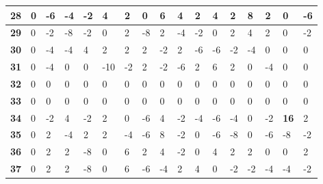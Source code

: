 \begin{longtable}[c]{|l|l|l|l|l|l|l|l|l|l|l|l|l|l|l|l|l|}
\textbf{28} & 0          & -6         & -4         & -2         & 4          & 2          & 0          & 6          & 4          & 2          & 4           & 2           & 8           & 2           & 0           & -6          \\ \hline
\textbf{29} & 0          & -2         & -8         & -2         & 0          & 2          & -8         & 2          & -4         & -2         & 0           & 2           & 4           & 2           & 0           & -2          \\ \hline
\textbf{30} & 0          & -4         & -4         & 4          & 2          & 2          & 2          & -2         & 2          & -6         & -6          & -2          & -4          & 0           & 0           & 0           \\ \hline
\textbf{31} & 0          & -4         & 0          & 0          & -10        & -2         & 2          & -2         & -6         & 2          & 6           & 2           & 0           & -4          & 0           & 0           \\ \hline
\textbf{32} & 0          & 0          & 0          & 0          & 0          & 0          & 0          & 0          & 0          & 0          & 0           & 0           & 0           & 0           & 0           & 0           \\ \hline
\textbf{33} & 0          & 0          & 0          & 0          & 0          & 0          & 0          & 0          & 0          & 0          & 0           & 0           & 0           & 0           & 0           & 0           \\ \hline
\textbf{34} & 0          & -2         & 4          & -2         & 2          & 0          & -6         & 4          & -2         & -4         & -6          & -4          & 0           & -2          & \textbf{16}          & 2           \\ \hline
\textbf{35} & 0          & 2          & -4         & 2          & 2          & -4         & -6         & 8          & -2         & 0          & -6          & -8          & 0           & -6          & -8          & -2          \\ \hline
\textbf{36} & 0          & 2          & 2          & -8         & 0          & 6          & 2          & 4          & -2         & 0          & 4           & 2           & 2           & 0           & 0           & 2           \\ \hline
\textbf{37} & 0          & 2          & 2          & -8         & 0          & 6          & -6         & -4         & 2          & 4          & 0           & -2          & -2          & -4          & -4          & -2          \\ \hline

\end{longtable}
